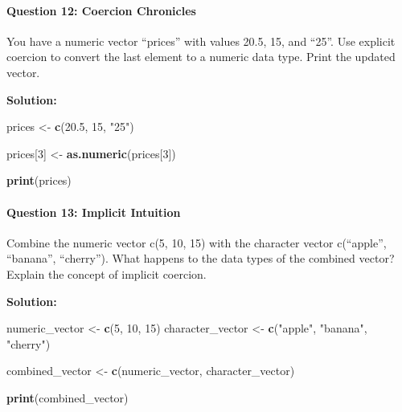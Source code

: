 \documentclass[
]{article}
\newenvironment{Shaded}{\begin{snugshade}}{\end{snugshade}}
\newcommand{\DecValTok}[1]{\textcolor[rgb]{0.00,0.00,0.81}{#1}}
\newcommand{\FloatTok}[1]{\textcolor[rgb]{0.00,0.00,0.81}{#1}}
\newcommand{\FunctionTok}[1]{\textcolor[rgb]{0.13,0.29,0.53}{\textbf{#1}}}
\newcommand{\NormalTok}[1]{#1}
\newcommand{\OtherTok}[1]{\textcolor[rgb]{0.56,0.35,0.01}{#1}}
\newcommand{\StringTok}[1]{\textcolor[rgb]{0.31,0.60,0.02}{#1}}
\begin{document}
\hypertarget{question-12-coercion-chronicles}{%
\paragraph{Question 12: Coercion
Chronicles}\label{question-12-coercion-chronicles}}

You have a numeric vector ``prices'' with values 20.5, 15, and ``25''.
Use explicit coercion to convert the last element to a numeric data
type. Print the updated vector.

\textbf{Solution:}

\begin{Shaded}
\begin{Highlighting}[]
\NormalTok{prices }\OtherTok{\textless{}{-}} \FunctionTok{c}\NormalTok{(}\FloatTok{20.5}\NormalTok{, }\DecValTok{15}\NormalTok{, }\StringTok{"25"}\NormalTok{)}

\NormalTok{prices[}\DecValTok{3}\NormalTok{] }\OtherTok{\textless{}{-}} \FunctionTok{as.numeric}\NormalTok{(prices[}\DecValTok{3}\NormalTok{])}

\FunctionTok{print}\NormalTok{(prices)}
\end{Highlighting}
\end{Shaded}

\hypertarget{question-13-implicit-intuition}{%
\paragraph{Question 13: Implicit
Intuition}\label{question-13-implicit-intuition}}

Combine the numeric vector c(5, 10, 15) with the character vector
c(``apple'', ``banana'', ``cherry''). What happens to the data types of
the combined vector? Explain the concept of implicit coercion.

\textbf{Solution:}

\begin{Shaded}
\begin{Highlighting}[]
\NormalTok{numeric\_vector }\OtherTok{\textless{}{-}} \FunctionTok{c}\NormalTok{(}\DecValTok{5}\NormalTok{, }\DecValTok{10}\NormalTok{, }\DecValTok{15}\NormalTok{)}
\NormalTok{character\_vector }\OtherTok{\textless{}{-}} \FunctionTok{c}\NormalTok{(}\StringTok{"apple"}\NormalTok{, }\StringTok{"banana"}\NormalTok{, }\StringTok{"cherry"}\NormalTok{)}

\NormalTok{combined\_vector }\OtherTok{\textless{}{-}} \FunctionTok{c}\NormalTok{(numeric\_vector, character\_vector)}

\FunctionTok{print}\NormalTok{(combined\_vector)}
\end{Highlighting}
\end{Shaded}
\end{document}
